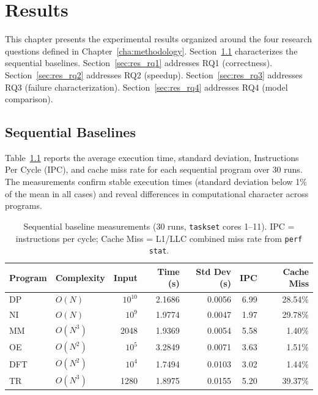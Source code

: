 \chapter{Results}\label{cap:resultado}

This chapter presents the experimental results organized around the four research questions defined in Chapter~\ref{cha:methodology}. Section~\ref{sec:res_baseline} characterizes the sequential baselines. Section~\ref{sec:res_rq1} addresses RQ1 (correctness). Section~\ref{sec:res_rq2} addresses RQ2 (speedup). Section~\ref{sec:res_rq3} addresses RQ3 (failure characterization). Section~\ref{sec:res_rq4} addresses RQ4 (model comparison).

\section{Sequential Baselines}
\label{sec:res_baseline}

Table~\ref{tab:baseline} reports the average execution time, standard deviation, Instructions Per Cycle (IPC), and cache miss rate for each sequential program over 30 runs. 
The measurements confirm stable execution times (standard deviation below 1\% of the mean in all cases) and reveal differences in computational character across programs.

\begin{table}[htbp]
\centering
\caption{Sequential baseline measurements (30 runs, \texttt{taskset} cores 1--11). IPC = instructions per cycle; Cache Miss = L1/LLC combined miss rate from \texttt{perf stat}.}
\label{tab:baseline}
\begin{tabular}{llrrrrr}
\toprule
\textbf{Program} & \textbf{Complexity} & \textbf{Input} & \textbf{Time (s)} & \textbf{Std Dev (s)} & \textbf{IPC} & \textbf{Cache Miss} \\
\midrule
DP      & $O(N)$   & $10^{10}$ & 2.1686 & 0.0056 & 6.99 & 28.54\% \\
NI      & $O(N)$   & $10^{9}$  & 1.9774 & 0.0047 & 1.97 & 29.78\% \\
MM      & $O(N^3)$ & 2048      & 1.9369 & 0.0054 & 5.58 &  1.40\% \\
OE      & $O(N^2)$ & $10^{5}$  & 3.2849 & 0.0071 & 3.63 &  1.51\% \\
DFT     & $O(N^2)$ & $10^{4}$  & 1.7494 & 0.0103 & 3.02 &  1.44\% \\
TR      & $O(N^3)$ & 1280      & 1.8975 & 0.0155 & 5.20 & 39.37\% \\
\bottomrule
\end{tabular}
\end{table}

